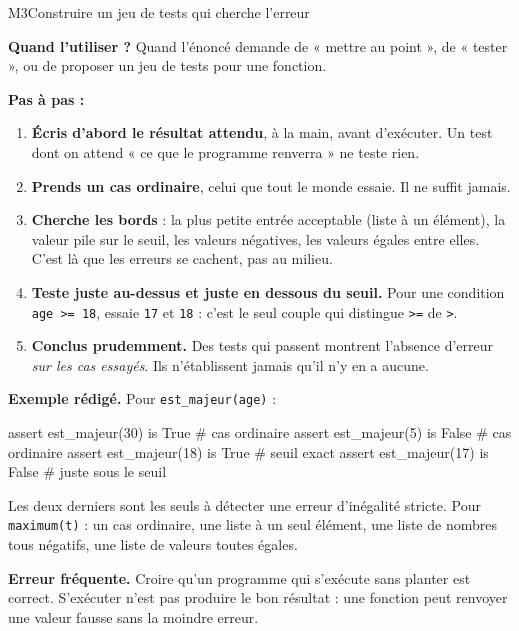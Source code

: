 \begin{fichemethode}{M3}{Construire un jeu de tests qui cherche l'erreur}

\textbf{Quand l'utiliser ?} Quand l'énoncé demande de « mettre au point », de « tester », ou
de proposer un jeu de tests pour une fonction.

\textbf{Pas à pas :}
\begin{enumerate}
  \item \textbf{Écris d'abord le résultat attendu}, à la main, avant d'exécuter. Un test dont
        on attend « ce que le programme renverra » ne teste rien.
  \item \textbf{Prends un cas ordinaire}, celui que tout le monde essaie. Il ne suffit jamais.
  \item \textbf{Cherche les bords} : la plus petite entrée acceptable (liste à un élément),
        la valeur pile sur le seuil, les valeurs négatives, les valeurs égales entre elles.
        C'est là que les erreurs se cachent, pas au milieu.
  \item \textbf{Teste juste au-dessus et juste en dessous du seuil.} Pour une condition
        \lstinline{age >= 18}, essaie \lstinline{17} et \lstinline{18} : c'est le seul couple
        qui distingue \lstinline{>=} de \lstinline{>}.
  \item \textbf{Conclus prudemment.} Des tests qui passent montrent l'absence d'erreur
        \emph{sur les cas essayés}. Ils n'établissent jamais qu'il n'y en a aucune.
\end{enumerate}

\textbf{Exemple rédigé.} Pour \lstinline{est_majeur(age)} :

\begin{python}
assert est_majeur(30) is True    # cas ordinaire
assert est_majeur(5) is False    # cas ordinaire
assert est_majeur(18) is True    # seuil exact
assert est_majeur(17) is False   # juste sous le seuil
\end{python}

Les deux derniers sont les seuls à détecter une erreur d'inégalité stricte. Pour
\lstinline{maximum(t)} : un cas ordinaire, une liste à un seul élément, une liste de nombres
tous négatifs, une liste de valeurs toutes égales.

\textbf{Erreur fréquente.} Croire qu'un programme qui s'exécute sans planter est correct.
S'exécuter n'est pas produire le bon résultat : une fonction peut renvoyer une valeur fausse
sans la moindre erreur.

\end{fichemethode}
